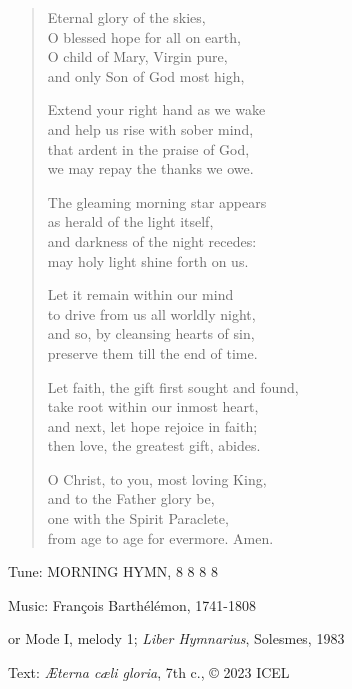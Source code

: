 \hymn

\begin{verse}
Eternal glory of the skies,\\
O blessed hope for all on earth,\\
O child of Mary, Virgin pure,\\
and only Son of God most high,

Extend your right hand as we wake\\
and help us rise with sober mind,\\
that ardent in the praise of God,\\
we may repay the thanks we owe.

The gleaming morning star appears\\
as herald of the light itself,\\
and darkness of the night recedes:\\
may holy light shine forth on us.

Let it remain within our mind\\
to drive from us all worldly night,\\
and so, by cleansing hearts of sin,\\
preserve them till the end of time.

Let faith, the gift first sought and found,\\
take root within our inmost heart,\\
and next, let hope rejoice in faith;\\
then love, the greatest gift, abides.

O Christ, to you, most loving King,\\
and to the Father glory be,\\
one with the Spirit Paraclete,\\
from age to age for evermore. Amen.
\end{verse}

\begin{hymnsource}
Tune: MORNING HYMN, 8 8 8 8

Music: François Barthélémon, 1741-1808

or Mode I, melody 1; \emph{Liber Hymnarius}, Solesmes, 1983

Text: \emph{Æterna cæli gloria}, 7th c., © 2023 ICEL
\end{hymnsource}
